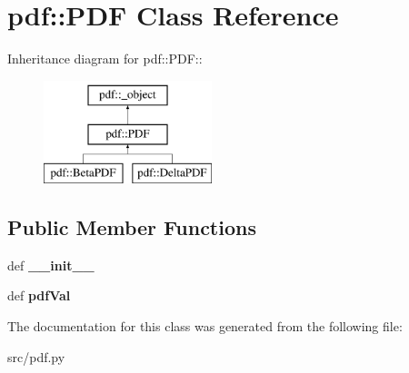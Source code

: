 \hypertarget{classpdf_1_1PDF}{
\section{pdf::PDF Class Reference}
\label{dd/d66/classpdf_1_1PDF}
}
Inheritance diagram for pdf::PDF::\begin{figure}[H]
\begin{center}
\leavevmode
\includegraphics[height=3cm]{dd/d66/classpdf_1_1PDF}
\end{center}
\end{figure}
\subsection*{Public Member Functions}
\begin{DoxyCompactItemize}
\item 
\hypertarget{classpdf_1_1PDF_ad3afb94bbbcb72475c89d7bb3f946da2}{
def {\bfseries \_\-\_\-init\_\-\_\-}}
\label{dd/d66/classpdf_1_1PDF_ad3afb94bbbcb72475c89d7bb3f946da2}

\item 
\hypertarget{classpdf_1_1PDF_a44e17a10e5b431ab10ed1f5741d05e30}{
def {\bfseries pdfVal}}
\label{dd/d66/classpdf_1_1PDF_a44e17a10e5b431ab10ed1f5741d05e30}

\end{DoxyCompactItemize}


The documentation for this class was generated from the following file:\begin{DoxyCompactItemize}
\item 
src/pdf.py\end{DoxyCompactItemize}
